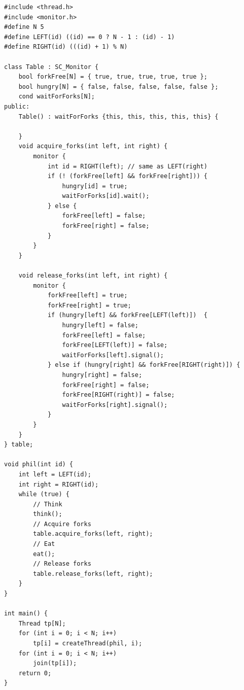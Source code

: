 \begin{lstlisting}
#include <thread.h>
#include <monitor.h>
#define N 5
#define LEFT(id) ((id) == 0 ? N - 1 : (id) - 1)
#define RIGHT(id) (((id) + 1) % N)

class Table : SC_Monitor {
    bool forkFree[N] = { true, true, true, true, true };
    bool hungry[N] = { false, false, false, false, false };
    cond waitForForks[N];
public:
    Table() : waitForForks {this, this, this, this, this} {
        
    }
    void acquire_forks(int left, int right) {
        monitor {
            int id = RIGHT(left); // same as LEFT(right)
            if (! (forkFree[left] && forkFree[right])) {
                hungry[id] = true;
                waitForForks[id].wait();
            } else {
                forkFree[left] = false;
                forkFree[right] = false;
            }
        }
    }

    void release_forks(int left, int right) {
        monitor {
            forkFree[left] = true;
            forkFree[right] = true;
            if (hungry[left] && forkFree[LEFT(left)])  {
                hungry[left] = false;
                forkFree[left] = false;
                forkFree[LEFT(left)] = false;
                waitForForks[left].signal();
            } else if (hungry[right] && forkFree[RIGHT(right)]) {
                hungry[right] = false;
                forkFree[right] = false;
                forkFree[RIGHT(right)] = false;
                waitForForks[right].signal();
            }
        }
    }
} table;

void phil(int id) {
    int left = LEFT(id);
    int right = RIGHT(id);
    while (true) {
        // Think
        think();
        // Acquire forks
        table.acquire_forks(left, right);
        // Eat
        eat();
        // Release forks
        table.release_forks(left, right);
    }
}

int main() {
    Thread tp[N];
    for (int i = 0; i < N; i++) 
        tp[i] = createThread(phil, i);
    for (int i = 0; i < N; i++) 
        join(tp[i]);
    return 0;
}

\end{lstlisting}
